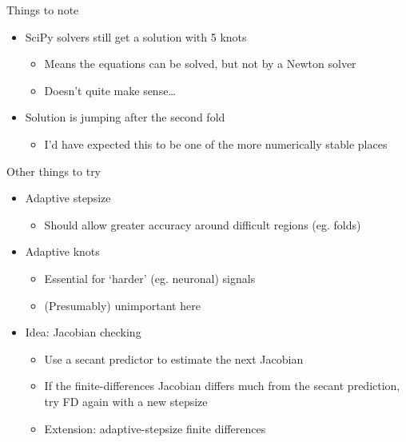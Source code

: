 \documentclass[presentation]{beamer}
\begin{document}
\begin{frame}[label={sec:orgf096a34}]{Things to note}
\begin{itemize}
\item SciPy solvers still get a solution with 5 knots
\begin{itemize}
\item Means the equations can be solved, but not by a Newton solver
\item Doesn't quite make sense\ldots{}
\end{itemize}
\end{itemize}

\vfill
\begin{itemize}
\item Solution is jumping after the second fold
\begin{itemize}
\item I'd have expected this to be one of the more numerically stable places
\end{itemize}
\end{itemize}
\end{frame}

\begin{frame}[label={sec:orgd9a5006}]{Other things to try}
\begin{itemize}
\item Adaptive stepsize
\begin{itemize}
\item Should allow greater accuracy around difficult regions (eg. folds)
\end{itemize}
\end{itemize}
\vfill
\begin{itemize}
\item Adaptive knots
\begin{itemize}
\item Essential for `harder' (eg. neuronal) signals
\item (Presumably) unimportant here
\end{itemize}
\end{itemize}
\vfill
\begin{itemize}
\item Idea: Jacobian checking
\begin{itemize}
\item Use a secant predictor to estimate the next Jacobian
\item If the finite-differences Jacobian differs much from the secant prediction, try FD again with a new stepsize
\item Extension: adaptive-stepsize finite differences
\end{itemize}
\end{itemize}
\end{frame}
\end{document}
